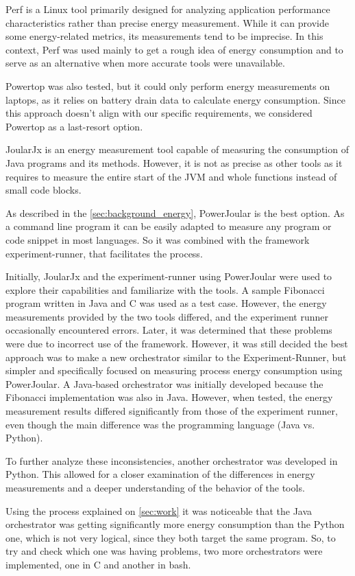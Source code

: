 \documentclass[sigplan]{acmart}
\begin{document}
Perf is a Linux tool primarily designed for analyzing application performance characteristics rather than precise energy measurement. While it can provide some energy-related metrics, its measurements tend to be imprecise. In this context, Perf was used mainly to get a rough idea of energy consumption and to serve as an alternative when more accurate tools were unavailable.

Powertop was also tested, but it could only perform energy measurements on laptops, as it relies on battery drain data to calculate energy consumption. Since this approach doesn't align with our specific requirements, we considered Powertop as a last-resort option.

JoularJx is an energy measurement tool capable of measuring the consumption of Java programs and its methods. However, it is not as precise as other tools as it requires to measure the entire start of the JVM and whole functions instead of small code blocks.

As described in the \ref{sec:background_energy}, PowerJoular is the best option. As a command line program it can be easily adapted to measure any program or code snippet in most languages. So it was combined with the framework experiment-runner, that facilitates the process.


Initially, JoularJx and the experiment-runner using PowerJoular were used to explore their capabilities and familiarize with the tools. A sample Fibonacci program written in Java and C was used as a test case. However, the energy measurements provided by the two tools differed, and the experiment runner occasionally encountered errors. Later, it was determined that these problems were due to incorrect use of the framework. However, it was still decided the best approach was to make a new orchestrator similar to the Experiment-Runner, but simpler and specifically focused on measuring process energy consumption using PowerJoular. A Java-based orchestrator was initially developed because the Fibonacci implementation was also in Java. However, when tested, the energy measurement results differed significantly from those of the experiment runner, even though the main difference was the programming language (Java vs. Python).

To further analyze these inconsistencies, another orchestrator was developed in Python. This allowed for a closer examination of the differences in energy measurements and a deeper understanding of the behavior of the tools.

Using the process explained on \ref{sec:work} it was noticeable that the Java orchestrator was getting significantly more energy consumption than the Python one, which is not very logical, since they both target the same program. So, to try and check which one was having problems, two more orchestrators were implemented, one in C and another in bash.
\end{document}
